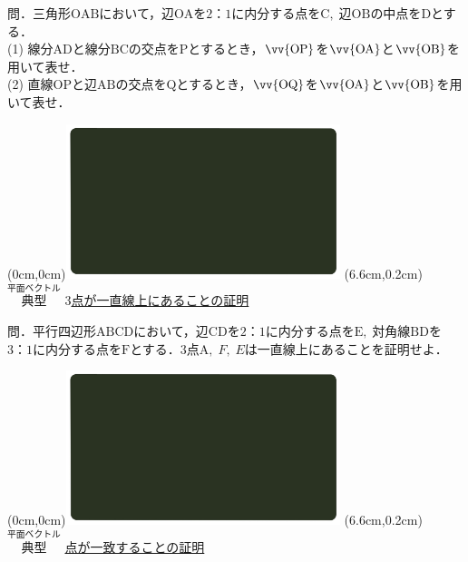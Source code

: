 \documentclass[10pt,
fleqn,
dvipdfmx,
uplatex
]{jsarticle}
\begin{document}
\small 
問．三角形$\text{OAB}$において，辺$\text{OA}$を$2：1$に内分する点を$\text{C},\;$辺$\text{OB}$の中点を$\text{D}$とする．\\
(1)  線分$\text{AD}$と線分$\text{BC}$の交点を$\text{P}$とするとき，$\vv{\text{OP}}$を$\vv{\text{OA}}$と$\vv{\text{OB}}$を用いて表せ．\\
(2)  直線$\text{OP}$と辺$\text{AB}$の交点を$\text{Q}$とするとき，$\vv{\text{OQ}}$を$\vv{\text{OA}}$と$\vv{\text{OB}}$を用いて表せ．\\



\newpage



\at(0cm,0cm){\includegraphics[width=8cm,bb=0 0 1920 1080]{./youtube/thumbnails/templates/smart_background/平面ベクトル.jpeg}}
\at(6.6cm,0.2cm){\small\color{bradorange}$\overset{\text{平面ベクトル}}{\text{典型}}$}
{\color{orange}\Large\underline{$3$点が一直線上にあることの証明}}\vspace{0.3zw}

\Large 
問．平行四辺形$\text{ABCD}$において，辺$\text{CD}$を$2：1$に内分する点を$\text{E},\;$対角線$\text{BD}$を$3：1$に内分する点を$\text{F}$とする．$3$点$\text{A},\;F,\;E$は一直線上にあることを証明せよ．


\newpage



\at(0cm,0cm){\includegraphics[width=8cm,bb=0 0 1920 1080]{./youtube/thumbnails/templates/smart_background/平面ベクトル.jpeg}}
\at(6.6cm,0.2cm){\small\color{bradorange}$\overset{\text{平面ベクトル}}{\text{典型}}$}
{\color{orange}\LARGE\underline{点が一致することの証明}}\vspace{0.3zw}
\end{document}
